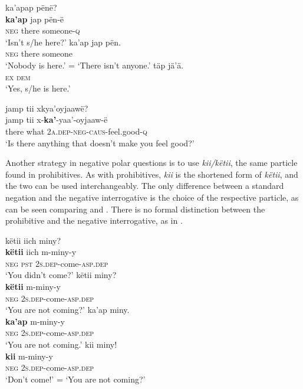 \documentclass[output=paper,colorlinks,citecolor=brown,draft]{langscibook}
\begin{document}
\ea\label{ex:mix:34}
    \ea\label{ex:mix:34a}
        \glll ka’apap pënë? \\ 
              \textbf{ka’ap} jap pën-ë\\
              \textsc{neg} there someone-\textsc{q}\\
        \glt ‘Isn’t s/he here?'
    \ex\label{ex:mix:34b}
        \gll ka’ap jap pën. \\
             \textsc{neg} there someone \\
        \glt ‘Nobody is here.’ = ‘There isn’t anyone.’
    \ex\label{ex:mix:34c}
        \gll täp jä’ä.\\
              \textsc{ex} \textsc{dem}\\
        \glt  ‘Yes, s/he is here.’
    \z
\z 

\ea\label{ex:mix:35}
    \glll jamp tii xkya’oyjaawë? \\
         jamp tii x-\textbf{ka’}{}-yaa’-oyjaaw-ë \\
         there what \textsc{2a.dep}{}-\textsc{neg-caus}{}-feel.good-\textsc{q}\\
    \glt ‘Is there anything that doesn’t make you feel good?’
\z

Another strategy in negative polar questions is to use \textit{kii/këtii}, the same particle found in prohibitives. As with prohibitives, \textit{kii} is the shortened form of \textit{këtii}, and the two can be used interchangeably. The only difference between a standard negation and the negative interrogative is the choice of the respective particle, as can be seen comparing  and . There is no formal distinction between the prohibitive and the negative interrogative, as in .
 
\ea\label{ex:mix:36}
    \ea\label{ex:mix:36a}
        \glll këtii iich miny?\\ 
              \textbf{këtii} iich m-miny-y\\
              \textsc{neg} \textsc{pst} \textsc{2s.dep-}come-\textsc{asp.dep} \\
        \glt  ‘You didn’t come?’
    \ex\label{ex:mix:36b}
        \glll këtii miny?\\
             \textbf{këtii} m-miny-y\\
             \textsc{neg} \textsc{2s.dep-}come-\textsc{asp.dep}\\
        \glt ‘You are not coming?’
    \ex\label{ex:mix:36c}
        \glll ka’ap miny.\\ 
              \textbf{ka’ap} m-miny-y\\
              \textsc{neg} \textsc{2s.dep-}come-\textsc{asp.dep}\\
        \glt ‘You are not coming.’    
    \ex\label{ex:mix:36d}
        \glll kii miny! \\
             \textbf{kii} m-miny-y \\
             \textsc{neg} \textsc{2s.dep-}come-\textsc{asp.dep}\\
        \glt ‘Don’t come!’ = ‘You are not coming?’
    \z
\z 
\end{document}

